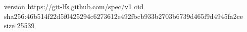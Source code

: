 version https://git-lfs.github.com/spec/v1
oid sha256:46b514f22d5f0425294c6273612e492fbcb933b2703b6739d465f9d4945fa2ce
size 25539
